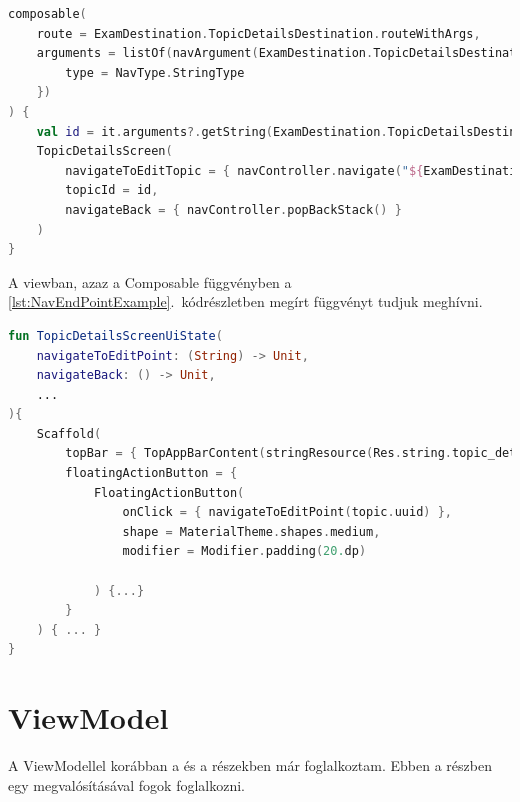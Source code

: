 \begin{lstlisting}[caption={Példa egy végpont felvételére a navigációs gráfban.}, label={lst:NavEndPointExample}, language=Kotlin]
composable(
    route = ExamDestination.TopicDetailsDestination.routeWithArgs,
    arguments = listOf(navArgument(ExamDestination.TopicDetailsDestination.topicIdArg) {
        type = NavType.StringType
    })
) {
    val id = it.arguments?.getString(ExamDestination.TopicDetailsDestination.topicIdArg) ?: "0"
    TopicDetailsScreen(
        navigateToEditTopic = { navController.navigate("${ExamDestination.TopicEditDestination.route}/$id") },
        topicId = id,
        navigateBack = { navController.popBackStack() }
    )
}    
\end{lstlisting}

A viewban, azaz a Composable függvényben a \ref{lst:NavEndPointExample}.~kódrészletben megírt függvényt tudjuk meghívni.

\begin{lstlisting}[caption={A navigáció viewban való megjelenése.}, label={lst:NavView}, language=Kotlin]
fun TopicDetailsScreenUiState(
    navigateToEditPoint: (String) -> Unit,
    navigateBack: () -> Unit,
    ...
){
    Scaffold(
        topBar = { TopAppBarContent(stringResource(Res.string.topic_details), navigateBack) },
        floatingActionButton = {
            FloatingActionButton(
                onClick = { navigateToEditPoint(topic.uuid) },
                shape = MaterialTheme.shapes.medium,
                modifier = Modifier.padding(20.dp)

            ) {...}
        }
    ) { ... }
}

\end{lstlisting}

\section{ViewModel}
\label{sec:VM}

A ViewModellel korábban a  és a  részekben már foglalkoztam.
Ebben a részben egy megvalósításával fogok foglalkozni.


